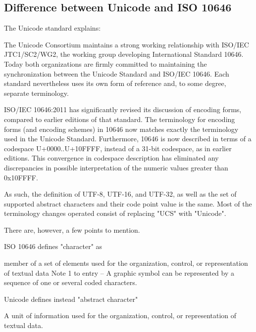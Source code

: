 \documentclass{wg21}
\begin{document}
\subsection{Difference between Unicode and ISO 10646}

The Unicode standard explains:

\begin{quoteblock}
The Unicode Consortium maintains a strong working relationship with ISO/IEC
JTC1/SC2/WG2, the working group developing International Standard 10646. Today both
organizations are firmly committed to maintaining the synchronization between the Unicode Standard and ISO/IEC 10646. Each standard nevertheless uses its own form of reference and, to some degree, separate terminology.
\end{quoteblock}

\begin{quoteblock}
ISO/IEC 10646:2011 has significantly revised its discussion of encoding forms, compared
to earlier editions of that standard. The terminology for encoding forms (and encoding
schemes) in 10646 now matches exactly the terminology used in the Unicode Standard.
Furthermore, 10646 is now described in terms of a codespace U+0000..U+10FFFF, instead
of a 31-bit codespace, as in earlier editions. This convergence in codespace description has
eliminated any discrepancies in possible interpretation of the numeric values greater than
0x10FFFF.
\end{quoteblock}

As such, the definition of UTF-8, UTF-16, and UTF-32, as well as the set of supported abstract characters and their code point value is the same.
Most of the terminology changes operated consist of replacing "UCS" with "Unicode".

There are, however, a few points to mention.

ISO 10646 defines "character" as
\begin{quoteblock}
member of a set of elements used for the organization, control, or representation of textual data
Note 1 to entry – A graphic symbol can be represented by a sequence of one or several coded characters.
\end{quoteblock}

Unicode defines instead "abstract character"
\begin{quoteblock}
A unit of information used for the organization, control, or representation of textual data.
\end{quoteblock}
\end{document}
